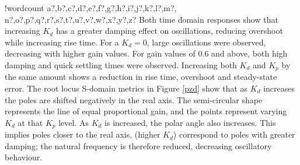 \documentclass[11pt]{article}
\newcounter{words}
\newenvironment{counted}{%
  \setcounter{words}{0}
  \SearchList!{wordcount}{\stepcounter{words}}
    {a?,b?,c?,d?,e?,f?,g?,h?,i?,j?,k?,l?,m?,
    n?,o?,p?,q?,r?,s?,t?,u?,v?,w?,x?,y?,z?}
  \UndoBoundary{'}
  \SearchOrder{p;}}{%
  \StopSearching}
\begin{document}
\begin{counted}
Both time domain responses show that increasing \(K_d\) has a greater
damping effect on oscillations, reducing overshoot while increasing rise
time. For a \(K_d = 0\), large oscillations were observed, decreasing
with higher gain values. For gain values of 0.6 and above, both high
damping and quick settling times were observed. Increasing both \(K_d\)
and \(K_p\) by the same amount shows a reduction in rise time, overshoot
and steady-state error. The root locus S-domain metrics in Figure
\ref{pzd} show that as \(K_d\) increases the poles are shifted
negatively in the real axis. The semi-circular shape represents the line
of equal proportional gain, and the points represent varying \(K_d\) at
that \(K_p\) level. As \(K_d\) is increased, the polar angle also
increases. This implies poles closer to the real axis, (higher \(K_d\))
correspond to poles with greater damping; the natural frequency is
therefore reduced, decreasing oscillatory behaviour.


\end{counted}
\end{document}
